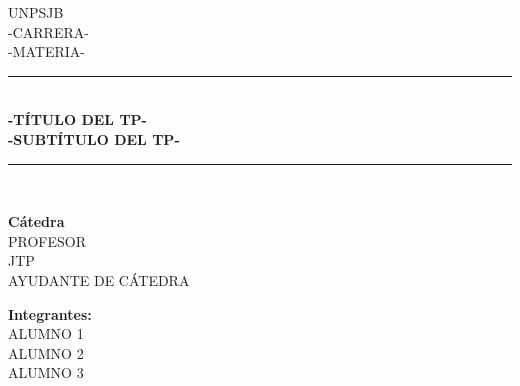\begin{titlepage}

    \newcommand{\HRule}{\rule{\linewidth}{0.5mm}} %

    \center %
     

    \textsc{\LARGE UNPSJB}\\[1cm] %
    \textsc{\Large -CARRERA-}\\[0.5cm] %
    \textsc{\large -MATERIA-}\\[0.5cm] %


    \HRule \\[0.4cm]
    {\huge \bfseries -TÍTULO DEL TP-}\\[0.4cm] %
    {\large \bfseries -SUBTÍTULO DEL TP-}\\[0.4cm] %
    \HRule \\[1.5cm]
     


    \begin{minipage}[l]{0.5\textwidth}
        \begin{flushleft}
            \textbf{\textsf{Cátedra}}\\
            \large PROFESOR\\ 
            \large JTP\\ 
            \large AYUDANTE DE CÁTEDRA\\ 
            \linespread{4}
            \end{flushleft}
    \end{minipage}
    \begin{minipage}[l]{0.4\textwidth}
        \begin{flushright}
            \textbf{\textsf{Integrantes:}}\\
            \linespread{1}
            \large ALUMNO 1\\
            \large ALUMNO 2\\
            \large ALUMNO 3\\
        \end{flushright}
    \end{minipage}\\[1.5cm]


\end{titlepage}
